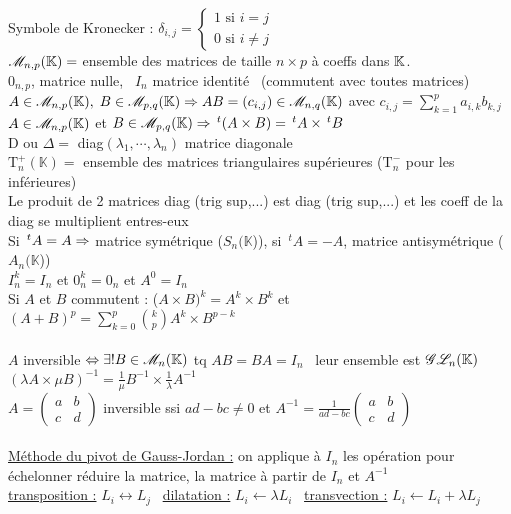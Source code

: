 \documentclass[12 pt]{exampleclass}
\begin{document}
\begin{flushleft}
\begin{doublespace}

	Symbole de Kronecker : $ \delta_{i,j} = \left\{\begin{array}{ll} 1\text{ si } i=j \\  0 \text{ si } i\ne j \end{array} \right.$ \\
	$\mathscr{M}_{n,p}(\mathbb{K}) = $ ensemble des matrices de taille $n\times p$ à coeffs dans $\mathbb{K}$.\\
	$0_{n,p}$, matrice nulle, \ $I_n$ matrice identité \ (commutent avec toutes matrices)\\
	$A\in \mathscr{M}_{n,p}(\mathbb{K}),\; B\in \mathscr{M}_{p,q}(\mathbb{K}) \Rightarrow AB=(c_{i,j}) \in \mathscr{M}_{n,q}(\mathbb{K})$ avec $c_{i,j} = \sum_{k= 1}^p a_{i,k} b_{k,j}$\\
	$A\in \mathscr{M}_{n,p}(\mathbb{K})$ et $B\in \mathscr{M}_{p,q}(\mathbb{K}) \Rightarrow \,^t(A\times B) = \,^tA\times \,^tB$\\
	D ou $\Delta =$ diag$(\lambda_1,\cdots,\lambda_n)$ matrice diagonale\\
	$\text{T}_n^+(\mathbb{K}) =$ ensemble des matrices triangulaires supérieures ($\text{T}_n^-$ pour les inférieures)\\
	Le produit de 2 matrices diag (trig sup,...) est diag (trig sup,...) et les coeff de la diag se multiplient entres-eux\\
	Si $\,^tA = A \Rightarrow$ matrice symétrique ($S_n(\mathbb{K}$)), si $\,^tA = -A$, matrice antisymétrique ($A_n(\mathbb{K}$))\\
	$I_n^k = I_n$ et $0_n^k = 0_n$ et $A^0 = I_n$ \\
	Si $A$ et $B$ commutent : ($A\times B)^k = A^k \times B^k$ et $(A + B)^p = \sum\limits_{k=0}^p \binom{k}{p} A^k \times B^{p-k}$\\
	\text{ }\\
	$A$ inversible $\Leftrightarrow \exists ! B\in \mathscr{M}_n(\mathbb{K}) $ tq $ AB=BA=I_n$ \ leur ensemble est $\mathscr{G}\mathscr{L}_n(\mathbb{K})$\\
	$(\lambda A \times \mu B)^{- 1} = \frac{1}{\mu}B^{- 1} \times \frac{1}{\lambda}A^{- 1}$\\ 
	$A = \begin{pmatrix} a & b \\ c & d \end{pmatrix}$ inversible ssi $ad- bc \ne 0$ et $A^{- 1} = \frac{1}{ad - bc}\begin{pmatrix} a & b \\ c & d \end{pmatrix}$\\
	
	\text{ }\\
	\underline{Méthode du pivot de Gauss-Jordan :} on applique à $I_n$ les opération pour échelonner réduire la matrice, la matrice à partir de $I_n$ et $A^{- 1}$\\
	\underline{transposition :} $L_i \leftrightarrow L_j$ \ \underline{dilatation :} $L_i \leftarrow \lambda L_i$ \  \underline{transvection :} $L_i \leftarrow L_i + \lambda L_j$\\


\end{doublespace}
\end{flushleft}
\end{document}
